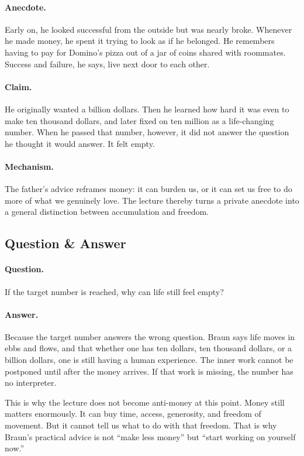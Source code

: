 \paragraph{Anecdote.} Early on, he looked successful from the outside but was nearly broke. Whenever he made money, he spent it trying to look as if he belonged. He remembers having to pay for Domino's pizza out of a jar of coins shared with roommates. Success and failure, he says, live next door to each other.

\paragraph{Claim.} He originally wanted a billion dollars. Then he learned how hard it was even to make ten thousand dollars, and later fixed on ten million as a life-changing number. When he passed that number, however, it did not answer the question he thought it would answer. It felt empty.

\paragraph{Mechanism.} The father's advice reframes money: it can burden us, or it can set us free to do more of what we genuinely love. The lecture thereby turns a private anecdote into a general distinction between accumulation and freedom.

\subsection{Question \& Answer}

\paragraph{Question.} If the target number is reached, why can life still feel empty?

\paragraph{Answer.} Because the target number answers the wrong question. Braun says life moves in ebbs and flows, and that whether one has ten dollars, ten thousand dollars, or a billion dollars, one is still having a human experience. The inner work cannot be postponed until after the money arrives. If that work is missing, the number has no interpreter.

This is why the lecture does not become anti-money at this point. Money still matters enormously. It can buy time, access, generosity, and freedom of movement. But it cannot tell us what to do with that freedom. That is why Braun's practical advice is not ``make less money'' but ``start working on yourself now.''

